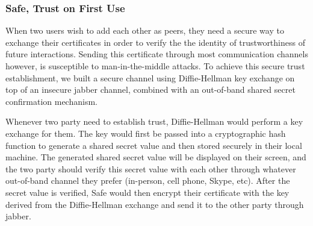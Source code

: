 \subsubsection{Safe, Trust on First Use}
\label{sec:tofu}
When two users wish to add each other as peers, they need a secure way to exchange their certificates in order to verify the the identity of trustworthiness of future interactions. Sending this certificate through most communication channels however, is susceptible to man-in-the-middle attacks. To achieve this secure trust establishment, we built a secure channel using Diffie-Hellman key exchange on top of an insecure jabber channel, combined with an out-of-band shared secret confirmation mechanism.

Whenever two party need to establish trust, Diffie-Hellman would perform a key exchange for them. The key would first be passed into a cryptographic hash function to generate a shared secret value and then stored securely in their local machine. The generated shared secret value will be displayed on their screen, and the two party should verify this secret value with each other through whatever out-of-band channel they prefer (in-person, cell phone, Skype, etc). After the secret value is verified, Safe would then encrypt their certificate with the key derived from the Diffie-Hellman exchange and send it to the other party through jabber.


